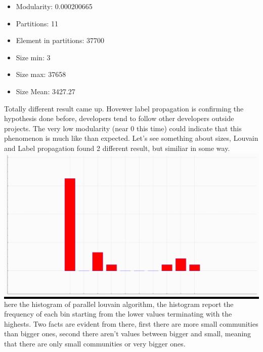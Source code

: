 \documentclass[]{article}
\begin{document}
    \begin{itemize}
        \item Modularity: 0.000200665
        \item Partitions: 11
        \item Element in partitions: 37700
        \item Size min: 3
        \item Size max: 37658
        \item Size Mean: 3427.27
    \end{itemize}
    Totally different result came up. Hovewer label propagation is confirming the hypothesis done before, developers tend to follow other developers outside projects. The very low modularity (near 0 this time) could indicate that this phenomenon is much like than expected. Let's see something about sizes, Louvain and Label propagation found 2 different result, but similiar in some way.\\
    \colorbox{black}{\includegraphics[width=15cm,height = 7.5cm]{charts/hist_cluster_sizePLM.png}}\\
    here the histogram of parallel louvain algorithm, the histogram report the frequency of each bin starting from the lower values terminating with the highests. Two facts are evident from there, first there are more small communities than bigger ones, second there aren't values between bigger and small, meaning that there are only small communities or very bigger ones. 
\end{document}
